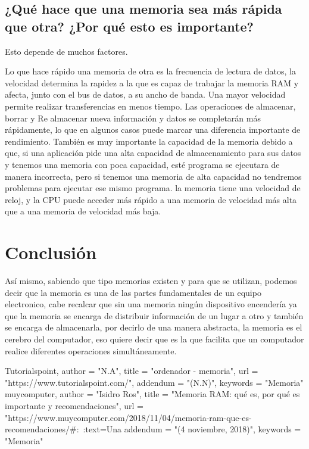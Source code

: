 \documentclass{article}
\begin{document}
\subsection{¿Qué hace que una memoria sea más rápida que otra? ¿Por qué esto es importante?}

Esto depende de muchos factores. \newline

Lo que hace rápido una memoria de otra es la frecuencia de lectura de datos, la velocidad determina la rapidez a la que es capaz de trabajar la memoria RAM y afecta, junto con el bus de datos, a su ancho de banda. Una mayor velocidad permite realizar transferencias en menos tiempo. Las operaciones de almacenar, borrar y Re almacenar nueva información y datos se completarán más rápidamente, lo que en algunos casos puede marcar una diferencia importante de rendimiento. También es muy importante la capacidad de la memoria debido a que, si una aplicación pide una alta capacidad de almacenamiento para sus datos y tenemos una memoria con poca capacidad, esté programa se ejecutara de manera incorrecta, pero si tenemos una memoria de alta capacidad no tendremos problemas para ejecutar ese mismo programa.
la memoria tiene una velocidad de reloj, y la CPU puede acceder más rápido a una memoria de velocidad más alta que a una memoria de velocidad más baja.


\section{Conclusión} \label{conclulsion}

Así mismo, sabiendo que tipo memorias existen y para que se utilizan, podemos decir que la memoria es una de las partes fundamentales de un equipo electronico, cabe recalcar que sin una memoria ningún dispositivo encendería ya que la memoria se encarga de distribuir información de un lugar a otro y también se encarga de almacenarla, por decirlo de una manera abstracta, la memoria es el cerebro del computador, eso quiere decir que es la que facilita que un computador realice diferentes operaciones simultáneamente. \newline




{
Tutorialspoint,
    author = "N.A",
    title = "ordenador - memoria",
    url  = "https://www.tutorialspoint.com/",
    addendum = "(N.N)",
    keywords = "Memoria" \newline
}
{
\newline muycomputer,
    author = "Isidro Ros",
    title = "Memoria RAM: qué es, por qué es importante y recomendaciones",
    url  = "https://www.muycomputer.com/2018/11/04/memoria-ram-que-es-recomendaciones/#:~:text=Una%
    addendum = "(4 noviembre, 2018)",
    keywords = "Memoria"
}
\end{document}
